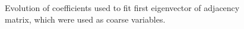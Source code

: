 \documentclass[11pt]{article}
\begin{document}
\begin{figure}
{    \label{fig:er4Coef}
  }
  \hspace{3mm}
  \caption{Evolution of coefficients used to fit first eigenvector of adjacency matrix, which were used as coarse variables.}
  \label{fig:erCoeff}
\end{figure}

\end{document}
